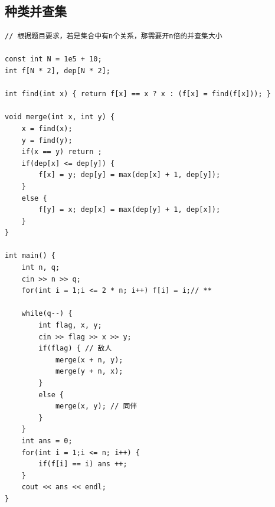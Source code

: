 \documentclass[twoside]{article}
\begin{document}
\subsection{种类并查集}
\begin{lstlisting}
// 根据题目要求，若是集合中有n个关系，那需要开n倍的并查集大小

const int N = 1e5 + 10;
int f[N * 2], dep[N * 2];

int find(int x) { return f[x] == x ? x : (f[x] = find(f[x])); }

void merge(int x, int y) {
    x = find(x);
    y = find(y);
    if(x == y) return ;
    if(dep[x] <= dep[y]) {
        f[x] = y; dep[y] = max(dep[x] + 1, dep[y]);
    }
    else { 
        f[y] = x; dep[x] = max(dep[y] + 1, dep[x]);
    }
}

int main() {
    int n, q;
    cin >> n >> q;
    for(int i = 1;i <= 2 * n; i++) f[i] = i;// **

    while(q--) {
        int flag, x, y;
        cin >> flag >> x >> y;
        if(flag) { // 敌人
            merge(x + n, y);
            merge(y + n, x);
        }
        else {
            merge(x, y); // 同伴
        }
    }    
    int ans = 0;
    for(int i = 1;i <= n; i++) {
        if(f[i] == i) ans ++;
    }
    cout << ans << endl;
}
\end{lstlisting}
\end{document}
